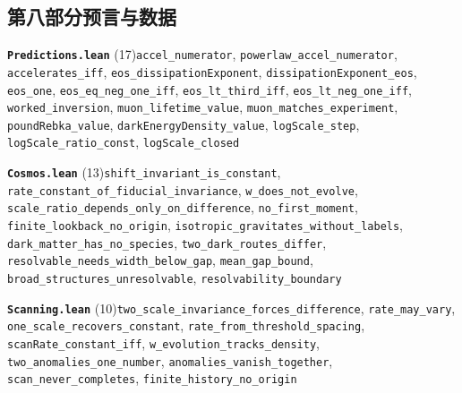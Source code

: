 \documentclass[11pt,a4paper]{article}
\theoremstyle{sudef}
\begin{document}
\subsection*{第八部分\quad 预言与数据}
\noindent\textbf{\texttt{Predictions.lean}} (17)\quad \texttt{accel\_\allowbreak numerator}, \texttt{powerlaw\_\allowbreak accel\_\allowbreak numerator}, \texttt{accelerates\_\allowbreak iff}, \texttt{eos\_\allowbreak dissipationExponent}, \texttt{dissipationExponent\_\allowbreak eos}, \texttt{eos\_\allowbreak one}, \texttt{eos\_\allowbreak eq\_\allowbreak neg\_\allowbreak one\_\allowbreak iff}, \texttt{eos\_\allowbreak lt\_\allowbreak third\_\allowbreak iff}, \texttt{eos\_\allowbreak lt\_\allowbreak neg\_\allowbreak one\_\allowbreak iff}, \texttt{worked\_\allowbreak inversion}, \texttt{muon\_\allowbreak lifetime\_\allowbreak value}, \texttt{muon\_\allowbreak matches\_\allowbreak experiment}, \texttt{poundRebka\_\allowbreak value}, \texttt{darkEnergyDensity\_\allowbreak value}, \texttt{logScale\_\allowbreak step}, \texttt{logScale\_\allowbreak ratio\_\allowbreak const}, \texttt{logScale\_\allowbreak closed}\par\smallskip
\noindent\textbf{\texttt{Cosmos.lean}} (13)\quad \texttt{shift\_\allowbreak invariant\_\allowbreak is\_\allowbreak constant}, \texttt{rate\_\allowbreak constant\_\allowbreak of\_\allowbreak fiducial\_\allowbreak invariance}, \texttt{w\_\allowbreak does\_\allowbreak not\_\allowbreak evolve}, \texttt{scale\_\allowbreak ratio\_\allowbreak depends\_\allowbreak only\_\allowbreak on\_\allowbreak difference}, \texttt{no\_\allowbreak first\_\allowbreak moment}, \texttt{finite\_\allowbreak lookback\_\allowbreak no\_\allowbreak origin}, \texttt{isotropic\_\allowbreak gravitates\_\allowbreak without\_\allowbreak labels}, \texttt{dark\_\allowbreak matter\_\allowbreak has\_\allowbreak no\_\allowbreak species}, \texttt{two\_\allowbreak dark\_\allowbreak routes\_\allowbreak differ}, \texttt{resolvable\_\allowbreak needs\_\allowbreak width\_\allowbreak below\_\allowbreak gap}, \texttt{mean\_\allowbreak gap\_\allowbreak bound}, \texttt{broad\_\allowbreak structures\_\allowbreak unresolvable}, \texttt{resolvability\_\allowbreak boundary}\par\smallskip
\noindent\textbf{\texttt{Scanning.lean}} (10)\quad \texttt{two\_\allowbreak scale\_\allowbreak invariance\_\allowbreak forces\_\allowbreak difference}, \texttt{rate\_\allowbreak may\_\allowbreak vary}, \texttt{one\_\allowbreak scale\_\allowbreak recovers\_\allowbreak constant}, \texttt{rate\_\allowbreak from\_\allowbreak threshold\_\allowbreak spacing}, \texttt{scanRate\_\allowbreak constant\_\allowbreak iff}, \texttt{w\_\allowbreak evolution\_\allowbreak tracks\_\allowbreak density}, \texttt{two\_\allowbreak anomalies\_\allowbreak one\_\allowbreak number}, \texttt{anomalies\_\allowbreak vanish\_\allowbreak together}, \texttt{scan\_\allowbreak never\_\allowbreak completes}, \texttt{finite\_\allowbreak history\_\allowbreak no\_\allowbreak origin}\par\smallskip
\end{document}
